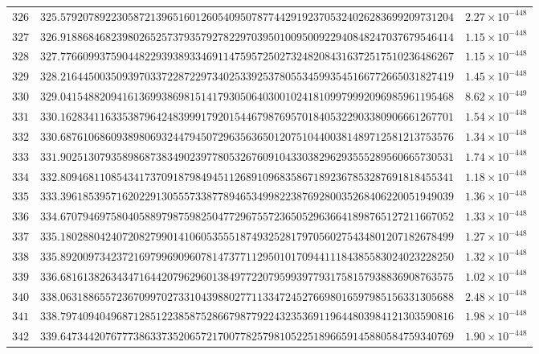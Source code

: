 \documentclass[12pt,reqno]{amsart}
\theoremstyle{remark}
\begin{document}
\begin{longtable}{clc}
$326$ & $325.5792078922305872139651601260540950787744291923705324026283699209731204$ & $2.27\times 10^{-448}$ \\
$327$ & $326.9188684682398026525737935792782297039501009500922940848247037679546414$ & $1.15\times 10^{-448}$ \\
$328$ & $327.7766099375904482293938933469114759572502732482084316372517510236486267$ & $1.15\times 10^{-448}$ \\
$329$ & $328.2164450035093970337228722973402533925378055345993545166772665031827419$ & $1.45\times 10^{-448}$ \\
$330$ & $329.0415488209416136993869815141793050640300102418109979992096985961195468$ & $8.62\times 10^{-449}$ \\
$331$ & $330.1628341163353879642483999179201544679876957018405322903380906661267701$ & $1.54\times 10^{-448}$ \\
$332$ & $330.6876106860938980693244794507296356365012075104400381489712581213753576$ & $1.34\times 10^{-448}$ \\
$333$ & $331.9025130793589868738349023977805326760910433038296293555289560665730531$ & $1.74\times 10^{-448}$ \\
$334$ & $332.8094681108543417370918798494511268910968358671892367853287691818455341$ & $1.18\times 10^{-448}$ \\
$335$ & $333.3961853957162022913055573387789465349982238769280035268406220051949039$ & $1.36\times 10^{-448}$ \\
$336$ & $334.6707946975804058897987598250477296755723650529636641898765127211667052$ & $1.33\times 10^{-448}$ \\
$337$ & $335.1802880424072082799014106053555187493252817970560275434801207182678499$ & $1.27\times 10^{-448}$ \\
$338$ & $335.8920097342372169799690960781473771129501017094411184385583024023228250$ & $1.32\times 10^{-448}$ \\
$339$ & $336.6816138263434716442079629601384977220795993977931758157938836908763575$ & $1.02\times 10^{-448}$ \\
$340$ & $338.0631886557236709970273310439880277113347245276698016597985156331305688$ & $2.48\times 10^{-448}$ \\
$341$ & $338.7974094049687128512238587528667987792243235369119644803984121303590816$ & $1.98\times 10^{-448}$ \\
$342$ & $339.6473442076777386337352065721700778257981052251896659145880584759340769$ & $1.90\times 10^{-448}$ \\

\end{longtable}
\end{document}
